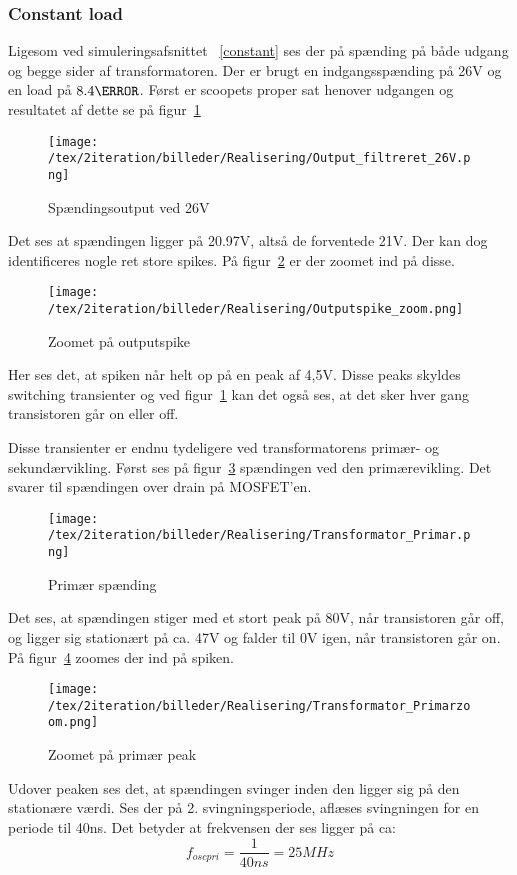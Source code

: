 \subsubsection{Constant load}
Ligesom ved simuleringsafsnittet ~\ref{constant} ses der på spænding på både udgang og begge sider af transformatoren. Der er brugt en indgangsspænding på 26V og en load på $8.4\ohm$. 
Først er scoopets proper sat henover udgangen og resultatet af dette se på figur~\ref{fig: Out26V}
\begin{figure}[H]
	\center
	\texttt{[image: /tex/2iteration/billeder/Realisering/Output\_filtreret\_26V.png]}
	\caption{Spændingsoutput ved 26V}
	\label{fig: Out26V}
\end{figure}
Det ses at spændingen ligger på 20.97V, altså de forventede 21V. Der kan dog identificeres nogle ret store spikes. På figur~\ref{fig: Out26Vzoom} er der zoomet ind på disse.
\begin{figure}[H]
	\center
	\texttt{[image: /tex/2iteration/billeder/Realisering/Outputspike\_zoom.png]}
	\caption{Zoomet på outputspike}
	\label{fig: Out26Vzoom}
\end{figure}
Her ses det, at spiken når helt op på en peak af 4,5V. Disse peaks skyldes switching transienter og ved figur~\ref{fig: Out26V} kan det også ses, at det sker hver gang transistoren går on eller off.

Disse transienter er endnu tydeligere ved transformatorens primær- og sekundærvikling. Først ses på figur~\ref{fig: privolt} spændingen ved den primærevikling. Det svarer til spændingen over drain på MOSFET'en. 
\begin{figure}[H]
	\center
	\texttt{[image: /tex/2iteration/billeder/Realisering/Transformator\_Primar.png]}
	\caption{Primær spænding}
	\label{fig: privolt}
\end{figure}
Det ses, at spændingen stiger med et stort peak på 80V, når transistoren går off, og ligger sig stationært på ca. 47V og falder til 0V igen, når transistoren går on. På figur~\ref{fig: prizoom} zoomes der ind på spiken.
\begin{figure}[H]
	\center
	\texttt{[image: /tex/2iteration/billeder/Realisering/Transformator\_Primarzoom.png]}
	\caption{Zoomet på primær peak}
	\label{fig: prizoom}
\end{figure}
Udover peaken ses det, at spændingen svinger inden den ligger sig på den stationære værdi. Ses der på 2. svingningsperiode, aflæses svingningen for en periode til 40ns. Det betyder at frekvensen der ses ligger på ca:
\begin{equation} \label{svingpri}
f_{oscpri} = \frac{1}{40ns} = 25MHz
\end{equation}

